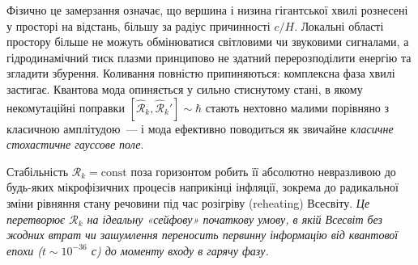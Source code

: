 \begin{enumerate}
    Фізично це замерзання означає, що вершина і низина
    гігантської хвилі рознесені у просторі на відстань,
    більшу за радіус причинності $c/H$. Локальні області
    простору більше не можуть обмінюватися світловими чи
    звуковими сигналами, а гідродинамічний тиск плазми
    принципово не здатний перерозподілити енергію та згладити
    збурення. Коливання повністю припиняються: комплексна
    фаза хвилі застигає. Квантова мода опиняється у сильно
    стиснутому стані, в якому некомутаційні поправки
    $[\hat{\mathcal{R}}_k, \hat{\mathcal{R}}_k'] \sim \hbar$
    стають нехтовно малими порівняно з класичною амплітудою~---
    і мода ефективно поводиться як звичайне
    \emph{класичне стохастичне гауссове поле}.

  Стабільність $\mathcal{R}_k = \mathrm{const}$ поза горизонтом робить її абсолютно невразливою до будь-яких мікрофізичних процесів наприкінці інфляції, зокрема до радикальної зміни рівняння стану речовини під час розігріву (reheating) Всесвіту. \emph{Це перетворює $\mathcal{R}_k$ на ідеальну «сейфову» початкову умову, в якій Всесвіт без жодних втрат чи зашумлення переносить первинну інформацію від квантової епохи ($t \sim 10^{-36}$ с) до моменту входу в гарячу фазу.}
\end{enumerate}

